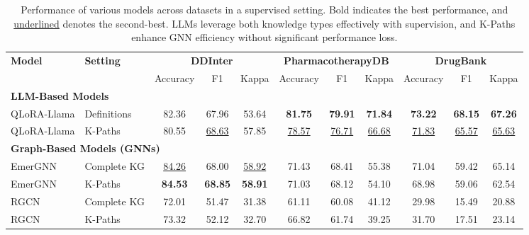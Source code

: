 \begin{table*}[t]
    \centering
    \small %
    \begin{adjustbox}{max width=\textwidth}
    \begin{tabular}{llccc|ccc|ccc}
        \toprule
        \multirow{2}{*}{\textbf{Model}} & \multirow{2}{*}{\textbf{Setting}} & \multicolumn{3}{c|}{\textbf{DDInter}} & \multicolumn{3}{c|}{\textbf{PharmacotherapyDB}} & \multicolumn{3}{c}{\textbf{DrugBank}} \\
        \cmidrule(lr){3-5} \cmidrule(lr){6-8} \cmidrule(lr){9-11}
        & & Accuracy & F1 & Kappa & Accuracy & F1 & Kappa & Accuracy & F1 & Kappa \\
        \midrule
        
        \multicolumn{11}{l}{\textbf{LLM-Based Models}} \\
        QLoRA-Llama & Definitions & 82.36 & 67.96 & 53.64 & \textbf{81.75} & \textbf{79.91} & \textbf{71.84} & \textbf{73.22} & \textbf{68.15} & \textbf{67.26} \\
        QLoRA-Llama & K-Paths & 80.55 & \underline{68.63} & 57.85 & \underline{78.57} & \underline{76.71} & \underline{66.68} & \underline{71.83} & \underline{65.57} & \underline{65.63} \\
        
        \midrule
        
        \multicolumn{11}{l}{\textbf{Graph-Based Models (GNNs)}} \\
        EmerGNN & Complete KG & \underline{84.26} & 68.00 & \underline{58.92} & 71.43 & 68.41 & 55.38 & 71.04 & 59.42 & 65.14 \\
        EmerGNN & K-Paths & \textbf{84.53} & \textbf{68.85} & \textbf{58.91} & 71.03 & 68.12 & 54.10 & 68.98 & 59.06 & 62.54 \\
        RGCN & Complete KG & 72.01 & 51.47 & 31.38 & 61.11 & 60.08 & 41.12 & 29.98 & 15.49 & 20.88 \\
        RGCN & K-Paths & 73.32 & 52.12 & 32.70 & 66.82 & 61.74 & 39.25 & 31.70 & 17.51 & 23.14 \\
        \bottomrule
    \end{tabular}
    \end{adjustbox}
    \caption{Performance of various models across datasets in a supervised setting. Bold indicates the best performance, and \underline{underlined} denotes the second-best. LLMs leverage both knowledge types effectively with supervision, and K-Paths enhance GNN efficiency without significant performance loss.}
    \label{tab:results-3}
\end{table*}

